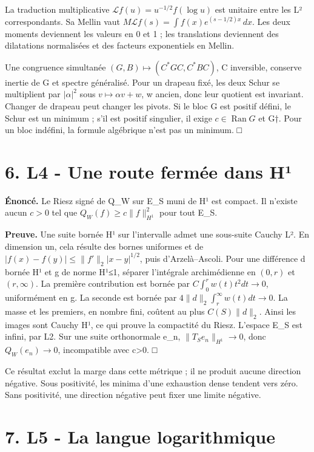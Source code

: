 \documentclass[
  10pt,
  a4paper,
]{article}
\begin{document}
La traduction multiplicative \(\mathcal L f(u)=u^{-1/2}f(\log u)\) est
unitaire entre les L² correspondants. Sa Mellin vaut
\(M\mathcal Lf(s)=\int f(x)e^{(s-1/2)x}\,dx\). Les deux moments
deviennent les valeurs en 0 et 1 ; les translations deviennent des
dilatations normalisées et des facteurs exponentiels en Mellin.

Une congruence simultanée \((G,B)\mapsto(C^*GC,C^*BC)\), C inversible,
conserve inertie de G et spectre généralisé. Pour un drapeau fixé, les
deux Schur se multiplient par \(|\alpha|^2\) sous
\(v\mapsto\alpha v+w\), w ancien, donc leur quotient est invariant.
Changer de drapeau peut changer les pivots. Si le bloc G est positif
défini, le Schur est un minimum ; s'il est positif singulier, il exige
\(c\in\operatorname{Ran}G\) et G†. Pour un bloc indéfini, la formule
algébrique n'est pas un minimum. □

\hypertarget{l4---une-route-fermuxe9e-dans-huxb9}{%
\section{6. L4 - Une route fermée dans
H¹}\label{l4---une-route-fermuxe9e-dans-huxb9}}

\textbf{Énoncé.} Le Riesz signé de Q\_W sur E\_S muni de H¹ est compact.
Il n'existe aucun \(c>0\) tel que \(Q_W(f)\ge c\|f\|_{H^1}^2\) pour tout
E\_S.

\textbf{Preuve.} Une suite bornée H¹ sur l'intervalle admet une
sous-suite Cauchy L². En dimension un, cela résulte des bornes uniformes
et de \(|f(x)-f(y)|\le\|f'\|_2|x-y|^{1/2}\), puis d'Arzelà--Ascoli. Pour
une différence d bornée H¹ et g de norme H¹≤1, séparer l'intégrale
archimédienne en \((0,r)\) et \((r,\infty)\). La première contribution
est bornée par \(C\int_0^r w(t)t^2dt\to0\), uniformément en g. La
seconde est bornée par \(4\|d\|_2\int_r^\infty w(t)dt\to0\). La masse et
les premiers, en nombre fini, coûtent au plus \(C(S)\|d\|_2\). Ainsi les
images sont Cauchy H¹, ce qui prouve la compactité du Riesz. L'espace
E\_S est infini, par L2. Sur une suite orthonormale e\_n,
\(\|T_Se_n\|_{H^1}\to0\), donc \(Q_W(e_n)\to0\), incompatible avec
c\textgreater0. □

Ce résultat exclut la marge dans cette métrique ; il ne produit aucune
direction négative. Sous positivité, les minima d'une exhaustion dense
tendent vers zéro. Sans positivité, une direction négative peut fixer
une limite négative.

\hypertarget{l5---la-langue-logarithmique}{%
\section{7. L5 - La langue
logarithmique}\label{l5---la-langue-logarithmique}}
\end{document}
